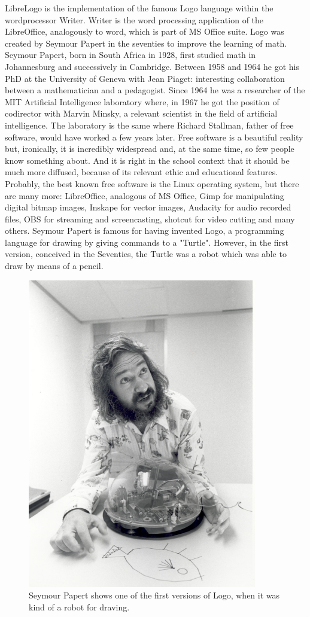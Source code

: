 LibreLogo is the implementation of the famous Logo language within the wordprocessor Writer. Writer is the word processing application of the LibreOffice, analogously to word, which is part of MS Office suite. Logo was created by Seymour Papert in the seventies to improve the learning of math. Seymour Papert, born in South Africa in 1928, first studied math in Johannesburg and successively in Cambridge. Between 1958 and 1964 he got his PhD at the University of Geneva with Jean Piaget: interesting collaboration between a mathematician and a pedagogist. Since 1964 he was a researcher of the MIT Artificial Intelligence laboratory where, in 1967  he got the position of codirector with Marvin Minsky, a relevant scientist in the field of artificial intelligence. The laboratory is the same where Richard Stallman, father of free software, would have worked a few years later. Free software is a beautiful reality but, ironically, it is incredibly widespread and, at the same time, so few people know something about. And it is right in the school context that it should be much more diffused, because of its relevant ethic and educational features. Probably, the best known free software is the Linux operating system, but there are many more: LibreOffice, analogous of MS Office, Gimp for manipulating digital bitmap images, Inskape for vector images, Audacity for audio recorded files, OBS for streaming and screencasting, shotcut for video cutting and many others. Seymour Papert is famous for having invented Logo, a programming language for drawing by giving commands to a "Turtle". However, in the first version, conceived in the Seventies, the Turtle was a robot which was able to draw by means of a pencil.

\begin{figure}
   \includegraphics[width=10.0cm]{./images/librelogo/Papert-x640.jpg}
   \caption{Seymour Papert shows one of the first versions of Logo, when it was kind of a robot for draving.} 
\label{papert}
\end{figure}

